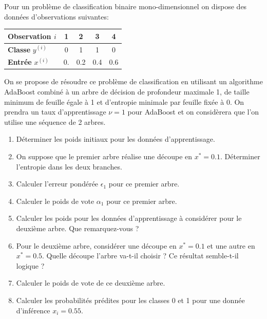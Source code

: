 \documentclass[solutions]{../exercices}
\begin{document}
	\begin{exercice}
		Pour un problème de classification binaire mono-dimensionnel on dispose des données d'observations suivantes:

		\begin{table}[h]
			\centering
			\begin{tabular}{|l|c|c|c|c|}
				\hline
				\textbf{Observation} $i$ & 1 & 2 & 3 & 4 \\
				\hline
				\textbf{Classe} $y^{(i)}$ & 0 & 1 & 1 & 0 \\
				\hline
				\textbf{Entrée} $x^{(i)}$ & 0. & 0.2 & 0.4 & 0.6 \\
				\hline
			\end{tabular}
		\end{table}

		On se propose de résoudre ce problème de classification en utilisant un algorithme AdaBoost combiné à un arbre de décision de profondeur maximale 1, de taille minimum de feuille égale à 1 et d'entropie minimale par feuille fixée à 0. On prendra un taux d'apprentissage $\nu = 1$ pour AdaBoost et on considèrera que l'on utilise une séquence de 2 arbres.

		\begin{enumerate}
			\item Déterminer les poids initiaux pour les données d'apprentissage.
			\item On suppose que le premier arbre réalise une découpe en $x^* = 0.1$. Déterminer l'entropie dans les deux branches.
			\item Calculer l'erreur pondérée $\epsilon_1$ pour ce premier arbre.
			\item Calculer le poids de vote $\alpha_1$ pour ce premier arbre.
			\item Calculer les poids pour les données d'apprentissage à considérer pour le deuxième arbre. Que remarquez-vous ?
			\item Pour le deuxième arbre, considérer une découpe en $x^*=0.1$ et une autre en $x^*=0.5$. Quelle découpe l'arbre va-t-il choisir ? Ce résultat semble-t-il logique ?
			\item Calculer le poids de vote de ce deuxième arbre.
			\item Calculer les probabilités prédites pour les classes 0 et 1 pour une donnée d'inférence $x_i = 0.55$.

		\end{enumerate}
	\end{exercice}
\end{document}
